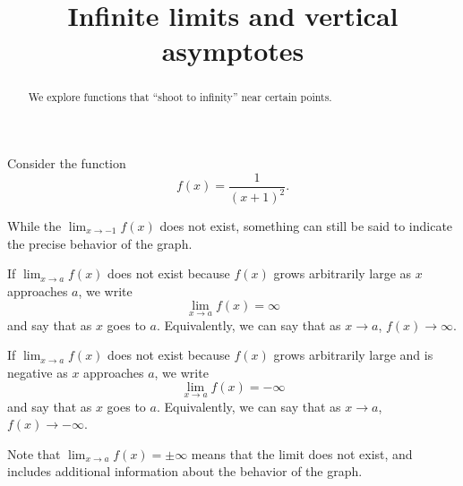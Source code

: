 \documentclass{ximera}
\title{Infinite limits and vertical asymptotes}
\begin{document}
\begin{abstract}
We explore functions that ``shoot to infinity'' near certain points.

\end{abstract}
\maketitle

Consider the function
\[
f(x) = \frac{1}{(x+1)^2}.
\]
\begin{image}
\end{image}
While the $\lim_{x\to -1} f(x)$ does not exist, something can still be
said to indicate the precise behavior of the graph.

\begin{definition}\label{def:inflimit}
If $\displaystyle\lim_{x\rightarrow a}f(x)$ does not exist because $f(x)$ grows arbitrarily large as $x$ approaches $a$, we write
\[
\lim_{x\to a} f(x) = \infty
\]
and say that  as $x$
goes to $a$. Equivalently, we can say that as $x\rightarrow a$, $f(x)\rightarrow\infty$.

If $\displaystyle\lim_{x\rightarrow a}f(x)$ does not exist because $f(x)$ grows arbitrarily large and is negative as $x$ approaches $a$, we write
\[
\lim_{x\to a} f(x) = -\infty
\]
and say that 
as $x$ goes to $a$. Equivalently, we can say that as $x\rightarrow a$, $f(x)\rightarrow-\infty$. 

Note that $\displaystyle\lim_{x\rightarrow a}f(x)=\pm\infty$ means that the limit does not exist, and includes additional information about the behavior of the graph.
\end{definition}
\end{document}
